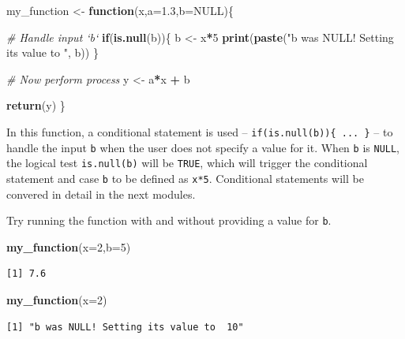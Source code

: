 \documentclass[
]{book}
\newenvironment{Shaded}{\begin{snugshade}}{\end{snugshade}}
\newcommand{\CommentTok}[1]{\textcolor[rgb]{0.56,0.35,0.01}{\textit{#1}}}
\newcommand{\ControlFlowTok}[1]{\textcolor[rgb]{0.13,0.29,0.53}{\textbf{#1}}}
\newcommand{\DataTypeTok}[1]{\textcolor[rgb]{0.13,0.29,0.53}{#1}}
\newcommand{\DecValTok}[1]{\textcolor[rgb]{0.00,0.00,0.81}{#1}}
\newcommand{\FloatTok}[1]{\textcolor[rgb]{0.00,0.00,0.81}{#1}}
\newcommand{\KeywordTok}[1]{\textcolor[rgb]{0.13,0.29,0.53}{\textbf{#1}}}
\newcommand{\NormalTok}[1]{#1}
\newcommand{\OperatorTok}[1]{\textcolor[rgb]{0.81,0.36,0.00}{\textbf{#1}}}
\newcommand{\OtherTok}[1]{\textcolor[rgb]{0.56,0.35,0.01}{#1}}
\newcommand{\StringTok}[1]{\textcolor[rgb]{0.31,0.60,0.02}{#1}}
\begin{document}
\begin{Shaded}
\begin{Highlighting}[]
\NormalTok{my_function <-}\StringTok{ }\ControlFlowTok{function}\NormalTok{(x,}\DataTypeTok{a=}\FloatTok{1.3}\NormalTok{,}\DataTypeTok{b=}\OtherTok{NULL}\NormalTok{)\{}
  
  \CommentTok{# Handle input `b`}
  \ControlFlowTok{if}\NormalTok{(}\KeywordTok{is.null}\NormalTok{(b))\{}
\NormalTok{    b <-}\StringTok{ }\NormalTok{x}\OperatorTok{*}\DecValTok{5}
    \KeywordTok{print}\NormalTok{(}\KeywordTok{paste}\NormalTok{(}\StringTok{"b was NULL! Setting its value to "}\NormalTok{, b))}
\NormalTok{  \}}
  
  \CommentTok{# Now perform process}
\NormalTok{  y <-}\StringTok{ }\NormalTok{a}\OperatorTok{*}\NormalTok{x }\OperatorTok{+}\StringTok{ }\NormalTok{b}
  
  \KeywordTok{return}\NormalTok{(y)}
\NormalTok{\}}
\end{Highlighting}
\end{Shaded}

In this function, a conditional statement is used -- \texttt{if(is.null(b))\{\ ...\ \}} -- to handle the input \texttt{b} when the user does not specify a value for it. When \texttt{b} is \texttt{NULL}, the logical test \texttt{is.null(b)} will be \texttt{TRUE}, which will trigger the conditional statement and case \texttt{b} to be defined as \texttt{x*5}. Conditional statements will be convered in detail in the next modules.

Try running the function with and without providing a value for \texttt{b}.

\begin{Shaded}
\begin{Highlighting}[]
\KeywordTok{my_function}\NormalTok{(}\DataTypeTok{x=}\DecValTok{2}\NormalTok{,}\DataTypeTok{b=}\DecValTok{5}\NormalTok{)}
\end{Highlighting}
\end{Shaded}

\begin{verbatim}
[1] 7.6
\end{verbatim}

\begin{Shaded}
\begin{Highlighting}[]
\KeywordTok{my_function}\NormalTok{(}\DataTypeTok{x=}\DecValTok{2}\NormalTok{)}
\end{Highlighting}
\end{Shaded}

\begin{verbatim}
[1] "b was NULL! Setting its value to  10"
\end{verbatim}
\end{document}
